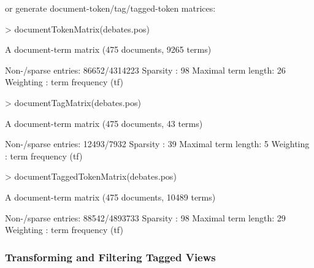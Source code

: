 \documentclass[11pt]{article}
\begin{document}
or generate document-token/tag/tagged-token matrices:
\begin{Schunk}
\begin{Sinput}
> documentTokenMatrix(debates.pos)
\end{Sinput}
\begin{Soutput}
A document-term matrix (475 documents, 9265 terms)

Non-/sparse entries: 86652/4314223
Sparsity           : 98%
Maximal term length: 26 
Weighting          : term frequency (tf)
\end{Soutput}
\begin{Sinput}
> documentTagMatrix(debates.pos)
\end{Sinput}
\begin{Soutput}
A document-term matrix (475 documents, 43 terms)

Non-/sparse entries: 12493/7932
Sparsity           : 39%
Maximal term length: 5 
Weighting          : term frequency (tf)
\end{Soutput}
\begin{Sinput}
> documentTaggedTokenMatrix(debates.pos)
\end{Sinput}
\begin{Soutput}
A document-term matrix (475 documents, 10489 terms)

Non-/sparse entries: 88542/4893733
Sparsity           : 98%
Maximal term length: 29 
Weighting          : term frequency (tf)
\end{Soutput}
\end{Schunk}

%

\subsubsection{Transforming and Filtering Tagged Views}\label{sec:tagtrans}
\end{document}

